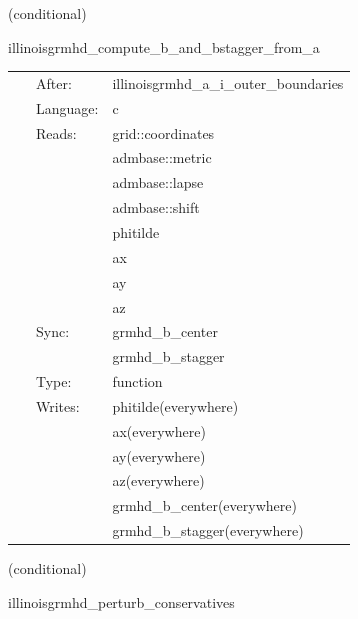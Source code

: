 \vspace{5mm}

   (conditional) 

\hspace{5mm} illinoisgrmhd\_compute\_b\_and\_bstagger\_from\_a 

\hspace{5mm}{\it compute b and b\_stagger from a sync: grmhd\_primitives\_bi,grmhd\_primitives\_bi\_stagger } 


\hspace{5mm}

 \begin{tabular*}{160mm}{cll} 
~ & After:  & illinoisgrmhd\_a\_i\_outer\_boundaries \\ 
~ & Language:  & c \\ 
~ & Reads:  & grid::coordinates \\ 
~& ~ &admbase::metric\\ 
~& ~ &admbase::lapse\\ 
~& ~ &admbase::shift\\ 
~& ~ &phitilde\\ 
~& ~ &ax\\ 
~& ~ &ay\\ 
~& ~ &az\\ 
~ & Sync:  & grmhd\_b\_center \\ 
~& ~ &grmhd\_b\_stagger\\ 
~ & Type:  & function \\ 
~ & Writes:  & phitilde(everywhere) \\ 
~& ~ &ax(everywhere)\\ 
~& ~ &ay(everywhere)\\ 
~& ~ &az(everywhere)\\ 
~& ~ &grmhd\_b\_center(everywhere)\\ 
~& ~ &grmhd\_b\_stagger(everywhere)\\ 
\end{tabular*} 


\vspace{5mm}

   (conditional) 

\hspace{5mm} illinoisgrmhd\_perturb\_conservatives 

\hspace{5mm}{\it perturb conservatives before con2prim } 


\hspace{5mm}

